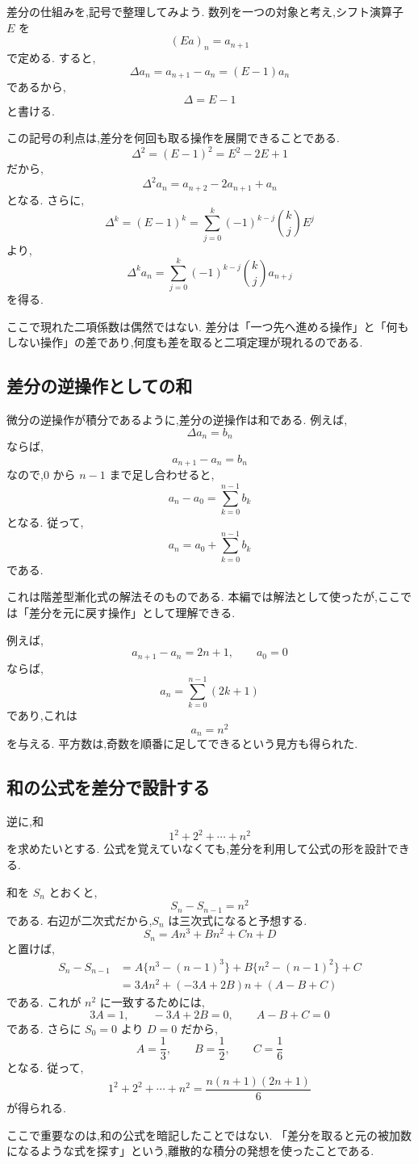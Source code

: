 差分の仕組みを,記号で整理してみよう.
数列を一つの対象と考え,シフト演算子 $E$ を
\[
  (Ea)_n=a_{n+1}
\]
で定める.
すると,
\[
  \Delta a_n=a_{n+1}-a_n=(E-1)a_n
\]
であるから,
\[
  \Delta=E-1
\]
と書ける.

この記号の利点は,差分を何回も取る操作を展開できることである.
\[
  \Delta^2=(E-1)^2=E^2-2E+1
\]
だから,
\[
  \Delta^2a_n=a_{n+2}-2a_{n+1}+a_n
\]
となる.
さらに,
\[
  \Delta^k=(E-1)^k
  =\sum_{j=0}^{k}(-1)^{k-j}\binom{k}{j}E^j
\]
より,
\[
  \Delta^ka_n
  =\sum_{j=0}^{k}(-1)^{k-j}\binom{k}{j}a_{n+j}
\]
を得る.

ここで現れた二項係数は偶然ではない.
差分は「一つ先へ進める操作」と「何もしない操作」の差であり,何度も差を取ると二項定理が現れるのである.

\subsection{差分の逆操作としての和}

微分の逆操作が積分であるように,差分の逆操作は和である.
例えば,
\[
  \Delta a_n=b_n
\]
ならば,
\[
  a_{n+1}-a_n=b_n
\]
なので,$0$ から $n-1$ まで足し合わせると,
\[
  a_n-a_0=\sum_{k=0}^{n-1}b_k
\]
となる.
従って,
\[
  a_n=a_0+\sum_{k=0}^{n-1}b_k
\]
である.

これは階差型漸化式の解法そのものである.
本編では解法として使ったが,ここでは「差分を元に戻す操作」として理解できる.

例えば,
\[
  a_{n+1}-a_n=2n+1,\qquad a_0=0
\]
ならば,
\[
  a_n=\sum_{k=0}^{n-1}(2k+1)
\]
であり,これは
\[
  a_n=n^2
\]
を与える.
平方数は,奇数を順番に足してできるという見方も得られた.

\subsection{和の公式を差分で設計する}

逆に,和
\[
  1^2+2^2+\cdots+n^2
\]
を求めたいとする.
公式を覚えていなくても,差分を利用して公式の形を設計できる.

和を $S_n$ とおくと,
\[
  S_n-S_{n-1}=n^2
\]
である.
右辺が二次式だから,$S_n$ は三次式になると予想する.
\[
  S_n=An^3+Bn^2+Cn+D
\]
と置けば,
\[
  \begin{aligned}
    S_n-S_{n-1}
     & =
    A\{n^3-(n-1)^3\}
    +B\{n^2-(n-1)^2\}
    +C   \\
     & =
    3An^2+(-3A+2B)n+(A-B+C)
  \end{aligned}
\]
である.
これが $n^2$ に一致するためには,
\[
  3A=1,\qquad -3A+2B=0,\qquad A-B+C=0
\]
である.
さらに $S_0=0$ より $D=0$ だから,
\[
  A=\frac13,\qquad B=\frac12,\qquad C=\frac16
\]
となる.
従って,
\[
  1^2+2^2+\cdots+n^2
  =\frac{n(n+1)(2n+1)}6
\]
が得られる.

ここで重要なのは,和の公式を暗記したことではない.
「差分を取ると元の被加数になるような式を探す」という,離散的な積分の発想を使ったことである.
